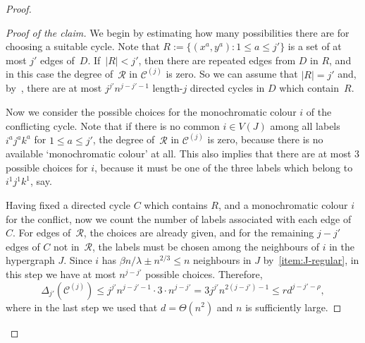 \documentclass[a4paper, 11pt,reqno]{amsart}
\newcommand{\calC}{\mathcal{C}}
\newcommand{\calR}{\mathcal{R}}
\theoremstyle{plain}
\theoremstyle{definition}
\numberwithin{equation}{section}
\newenvironment{proofclaim}[1][Proof of the claim]{\begin{proof}[#1]\renewcommand*{\qedsymbol}{\(\square\)}}{\end{proof}}
\renewcommand*{\qedsymbol}{\(\blacksquare\)}
\begin{document}
\begin{proof}
\begin{proofclaim}
	We begin by estimating how many possibilities there are for choosing a suitable cycle.
	Note that $R := \{ (x^a, y^a) : 1 \leq a \leq j' \}$ is a set of at most $j'$ edges of~$D$.  
	If~$|R|<j'$, then there are repeated edges from $D$ in $R$, 
	and in this case the degree of~$\calR$ in $\calC^{(j)}$ is zero. 
	So we can assume that $|R|=j'$ and, by~, 
	there are at most $j^{j'} n^{j-j'-1}$ length-$j$ directed cycles in $D$ which contain~$R$.
	
	Now we consider the possible choices for the monochromatic colour $i$ of the conflicting cycle.
	Note that if there is no common $i \in V(J)$ among all labels $i^a j^a k^a$ for ${1 \leq a \leq j'}$, the degree of~$\calR$ in $\calC^{(j)}$ is zero, because there is no available `monochromatic colour' at all.
	This also implies that there are at most $3$ possible choices for $i$, because it must be one of the three labels which belong to $i^1 j^1 k^1$, say.
	
	Having fixed a directed cycle $C$ which contains $R$, and a monochromatic colour $i$ for the conflict,
	now we count the number of labels associated with each edge of $C$.
	For edges of~$\calR$, the choices are already given, %
	and for the remaining ${j-j'}$ edges of $C$ not in~$\calR$, the labels must be chosen among the neighbours of $i$ in the hypergraph $J$.
	Since $i$ has $\beta n / \lambda \pm n^{2/3}\leq n$ neighbours in $J$ by~\ref{item:J-regular}, 
	in this step we have at most $n^{j-j'}$ possible choices. 
	Therefore,
	\[
	\Delta_{j'}(\mathcal{C}^{(j)}) \leq j^{j'} n^{j - j' - 1}
	\cdot 3 \cdot n^{j-j'} = 3 j^{j'} n^{2(j-j') - 1} \leq r d^{j - j' - \rho},
	\]
	where in the last step we used that $d = \Theta(n^2)$ and $n$ is sufficiently large.
\end{proofclaim}


\end{proof}
\end{document}
